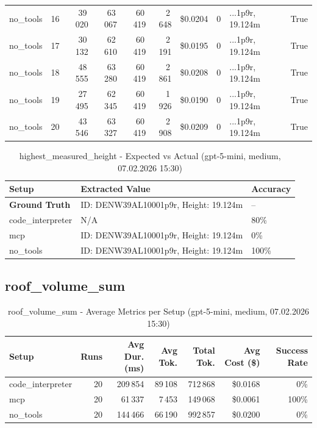\documentclass[a4paper,11pt]{article}
\begin{document}
\begin{table}[H]
{\begin{tabular}{l r r r r r r r l r}
no\_tools & 16 & 39\,020 & 63\,067 & 60\,419 & 2\,648 & \$0.0204 & 0 & ...1p9r, 19.124m & True \\
no\_tools & 17 & 30\,132 & 62\,610 & 60\,419 & 2\,191 & \$0.0195 & 0 & ...1p9r, 19.124m & True \\
no\_tools & 18 & 48\,555 & 63\,280 & 60\,419 & 2\,861 & \$0.0208 & 0 & ...1p9r, 19.124m & True \\
no\_tools & 19 & 27\,495 & 62\,345 & 60\,419 & 1\,926 & \$0.0190 & 0 & ...1p9r, 19.124m & True \\
no\_tools & 20 & 43\,546 & 63\,327 & 60\,419 & 2\,908 & \$0.0209 & 0 & ...1p9r, 19.124m & True \\
\bottomrule
\end{tabular}}
\end{table}

\begin{table}[H]
\centering
\scriptsize
\caption{highest\_measured\_height - Expected vs Actual (gpt-5-mini, medium, 07.02.2026 15:30)}
\begin{tabular}{l l l}
\toprule
Setup & Extracted Value & Accuracy \\
\midrule
\textbf{Ground Truth} & ID: DENW39AL10001p9r, Height: 19.124m & -- \\
\midrule
code\_interpreter & N/A & 80\% \\
mcp & ID: DENW39AL10001p9r, Height: 19.124m & 0\% \\
no\_tools & ID: DENW39AL10001p9r, Height: 19.124m & 100\% \\
\bottomrule
\end{tabular}
\end{table}

\clearpage

\subsection{roof\_volume\_sum}

\begin{table}[H]
\centering
\scriptsize
\caption{roof\_volume\_sum - Average Metrics per Setup (gpt-5-mini, medium, 07.02.2026 15:30)}
\label{tab:combined\_roof\_volume\_sum\_metrics\_20260207}
\begin{tabular}{l r r r r r r}
\toprule
Setup & Runs & Avg Dur. (ms) & Avg Tok. & Total Tok. & Avg Cost (\$) & Success Rate \\
\midrule
code\_interpreter & 20 & 209\,854 & 89\,108 & 712\,868 & \$0.0168 & 0\% \\
mcp & 20 & 61\,337 & 7\,453 & 149\,068 & \$0.0061 & 100\% \\
no\_tools & 20 & 144\,466 & 66\,190 & 992\,857 & \$0.0200 & 0\% \\
\bottomrule
\end{tabular}
\end{table}
\end{document}
